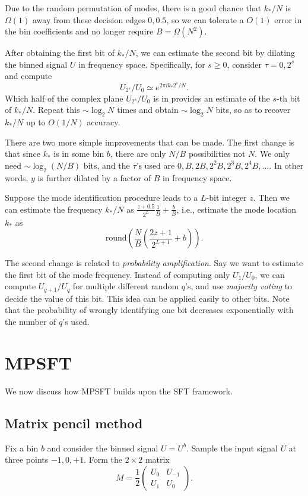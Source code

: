 \documentclass[10pt]{article}
\begin{document}
Due to the random permutation of modes, there is a good chance that $k_*/N$ is $\Omega(1)$ away from these decision edges $0,0.5$, so we can tolerate a $O(1)$ error in the bin coefficients and no longer require $B=\Omega(N^2)$.

After obtaining the first bit of $k_*/N$, we can estimate the second bit by dilating the binned signal $U$ in frequency space. Specifically, for $s\geq 0$, consider $\tau=0,2^s$ and compute
$$U_{2^s}/U_0 \simeq e^{2\pi i k_* 2^s/N}.$$
Which half of the complex plane $U_{2^s}/U_0$ is in provides an estimate of the $s$-th bit of $k_*/N$. Repeat this $\sim \log_2 N$ times and obtain $\sim \log_2 N$ bits, so as to recover $k_*/N$ up to $O(1/N)$ accuracy.

There are two more simple improvements that can be made. The first change is that since $k_*$ is in some bin $b$, there are only $N/B$ possibilities not $N$. We only need $\sim \log_2 (N/B)$ bits, and the $\tau$'s used are $0, B, 2B, 2^2 B, 2^3 B, 2^4 B, \ldots$. In other words, $y$ is further dilated by a factor of $B$ in frequency space.

Suppose the mode identification procedure leads to a $L$-bit integer $z$. Then we can estimate the frequency $k_*/N$ as $\frac{z+0.5}{2^L} \frac{1}{B} + \frac{b}{B}$, i.e., estimate the mode location $k_*$ as
$$\text{round}\left( \frac{N}{B} \left( \frac{2z+1}{2^{L+1}} + b\right)\right).$$

The second change is related to \emph{probability amplification}. Say we want to estimate the first bit of the mode frequency. Instead of computing only $U_{1}/U_0$, we can compute $U_{q+1}/U_q$ for multiple different random $q$'s, and use \emph{majority voting} to decide the value of this bit. This idea can be applied easily to other bits. Note that the probability of wrongly identifying one bit decreases exponentially with the number of $q$'s used.

\section{MPSFT}

We now discuss how MPSFT builds upon the SFT framework.

\subsection{Matrix pencil method}
Fix a bin $b$ and consider the binned signal $U=U^b$. Sample the input signal $U$ at three points $-1, 0, +1$. Form the $2\times 2$ matrix
$$M = \frac{1}{2} \left( \begin{array}{cc}
U_0 & U_{-1} \\
U_{1} & U_0
\end{array} \right).$$
\end{document}
